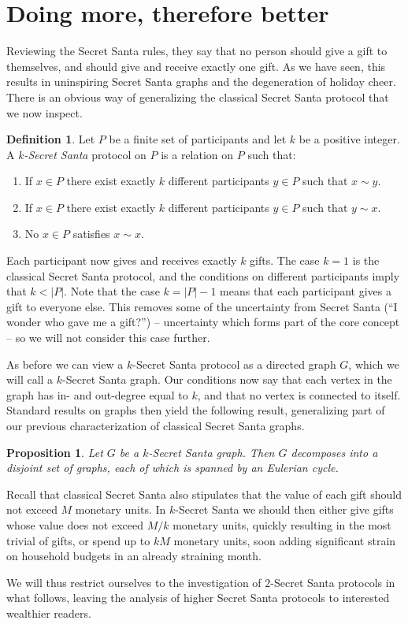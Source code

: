 \documentclass[10pt,a4paper]{amsart}
\newtheorem{prop}[theo]{Proposition}
\theoremstyle{definition}
\newtheorem{defi}[theo]{Definition}
\begin{document}
\section{Doing more, therefore better}

Reviewing the Secret Santa rules, they say that no person should give a gift to
themselves, and should give and receive exactly one gift.
As we have seen, this results in uninspiring Secret Santa graphs and the
degeneration of holiday cheer.
There is an obvious way of generalizing the classical Secret Santa protocol
that we now inspect.


\begin{defi}
Let $P$ be a finite set of participants and let $k$ be a positive
integer. A \emph{$k$-Secret Santa} protocol on $P$ is a relation on $P$
such that:
\begin{enumerate}
\item
If $x \in P$ there exist exactly $k$ different participants $y \in P$ such
that $x \sim y$.

\item
If $x \in P$ there exist exactly $k$ different participants $y \in P$ such
that $y \sim x$.

\item
No $x \in P$ satisfies $x \sim x$.
\end{enumerate}
\end{defi}

Each participant now gives and receives exactly $k$ gifts.
The case $k = 1$ is the classical Secret Santa protocol, and
the conditions on different participants imply that $k < |P|$.
Note that the case $k = |P| - 1$ means that each participant gives a gift to
everyone else.
This removes some of the uncertainty from Secret Santa (``I wonder who gave me
a gift?'') -- uncertainty which forms part of the core concept -- so we will not
consider this case further.

As before we can view a $k$-Secret Santa protocol as a directed graph $G$, which
we will call a $k$-Secret Santa graph.
Our conditions now say that each vertex in the graph has in- and out-degree
equal to $k$, and that no vertex is connected to itself.
Standard results on graphs then yield the following result, generalizing part
of our previous characterization of classical Secret Santa graphs.


\begin{prop}
Let $G$ be a $k$-Secret Santa graph. Then $G$ decomposes into a disjoint set of
graphs, each of which is spanned by an Eulerian cycle.
\end{prop}


Recall that classical Secret Santa also stipulates that the value of each gift
should not exceed $M$ monetary units.
In $k$-Secret Santa we should then either give gifts whose value does not
exceed $M / k$ monetary units, quickly resulting in the most trivial of gifts,
or spend up to $kM$ monetary units, soon adding significant strain on
household budgets in an already straining month.

We will thus restrict ourselves to the investigation of $2$-Secret Santa
protocols in what follows, leaving the analysis of higher Secret Santa
protocols to interested wealthier readers.
\end{document}
